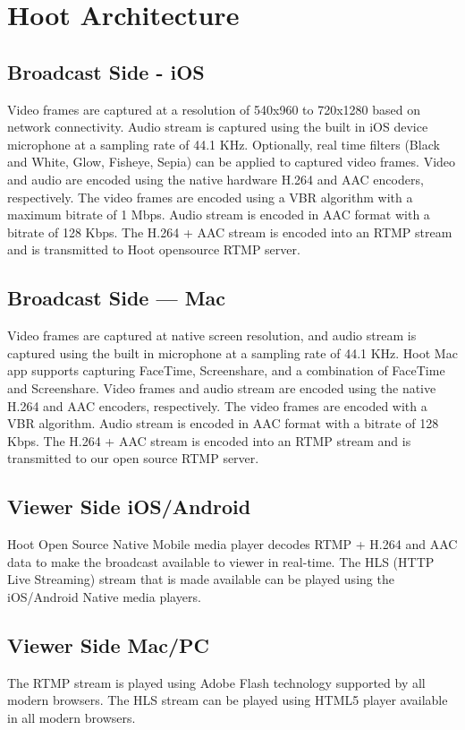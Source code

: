 \section{Hoot Architecture}
\subsection{Broadcast Side - iOS}
Video frames are captured at a resolution of 540x960 to 720x1280 based on network connectivity. Audio stream is captured using the built in iOS device microphone at a sampling rate of 44.1 KHz. Optionally, real time filters (Black and White, Glow, Fisheye, Sepia) can be applied to captured video frames. Video and audio are encoded using the native hardware H.264 and AAC encoders, respectively. The video frames are encoded using a VBR algorithm with a maximum bitrate of 1 Mbps. Audio stream is encoded in AAC format with a bitrate of 128 Kbps. The H.264 + AAC stream is encoded into an RTMP stream and is transmitted to Hoot opensource RTMP server.

\subsection{Broadcast Side — Mac}
Video frames are captured at native screen resolution, and audio stream is captured using the built in microphone at a sampling rate of 44.1 KHz. Hoot Mac app supports capturing FaceTime, Screenshare, and a combination of FaceTime and Screenshare. Video frames and audio stream are encoded using the native H.264 and AAC encoders, respectively. The video frames are encoded with a VBR algorithm. Audio stream is encoded in AAC format with a bitrate of 128 Kbps. The H.264 + AAC stream is encoded into an RTMP stream and is transmitted to our open source RTMP server.

\subsection{Viewer Side iOS/Android }
 Hoot Open Source Native Mobile media player decodes RTMP + H.264 and AAC data to make the broadcast available to viewer in real-time. The HLS (HTTP Live Streaming) stream that is made available can be played using the iOS/Android Native media players.

\subsection{Viewer Side Mac/PC} 
The RTMP stream is played using Adobe Flash technology supported by all modern browsers. The HLS stream can be played using HTML5 player available in all modern browsers.
